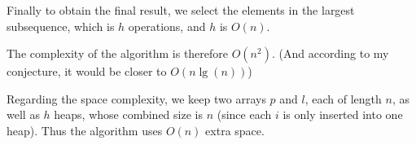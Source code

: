 \documentclass{article}
\begin{document}
Finally to obtain the final result, we select the elements in the largest subsequence, which is \(h\) operations, and \(h\) is \(O(n)\).

The complexity of the algorithm is therefore \(O(n^2)\). (And according to my conjecture, it would be closer to \(O(n\lg(n))\))

Regarding the space complexity, we keep two arrays \(p\) and \(l\), each of length \(n\), as well as \(h\) heaps, whose combined size is \(n\) (since each \(i\) is only inserted into one heap). Thus the algorithm uses \(O(n)\) extra space.
\end{document}

